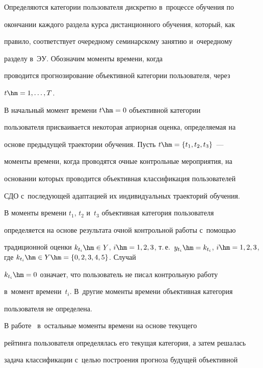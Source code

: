 Определяются категории пользователя дискретно в~процессе обуче\-ния по 


окончании каждого раздела курса дистанционного обуче\-ния, который, как 


правило, соответствует очередному семинарскому занятию и~очередному 


разделу в~ЭУ. Обозначим моменты времени, когда 


проводится прогнозирование объективной категории пользователя, через 


$t\hm= 1,\ldots , T$.


     


     В начальный момент времени $t\hm=0$ объективной категории 


пользователя присваивается некоторая априорная оценка, определяемая на 


осно\-ве предыдущей траектории обуче\-ния. Пусть $t\hm= \{t_1, t_2, t_3\}$~--- 


моменты времени, когда проводятся очные контрольные мероприятия, на 


основании которых проводится объективная классификация пользователей 


СДО с~последующей адаптацией их индивидуальных траекторий обуче\-ния.


     


     В моменты времени $t_1$, $t_2$ и~$t_3$ объективная категория пользователя 


  определяется на основе результата очной контрольной работы с~помощью 


традиционной оценки $k_{t_i}\hm\in Y$, $i\hm= 1,2,3$, т.\,е.\ $y_{t_i}\hm= 


k_{t_i}$, $i\hm= 1,2,3$, где $k_{t_i} \hm\in Y\hm= \{0,2,3,4,5\}$. Случай 


$k_{t_i}\hm=0$ означает, что пользователь не писал контрольную работу 


в~момент времени~$t_i$. В~другие моменты времени объективная категория 


пользователя не определена.


     


     В работе~\cite{4-nau} в~остальные моменты времени на основе текущего 


рейтинга пользователя определялась его текущая категория, а затем решалась 


задача классификации с~целью построения прогноза будущей объективной 


